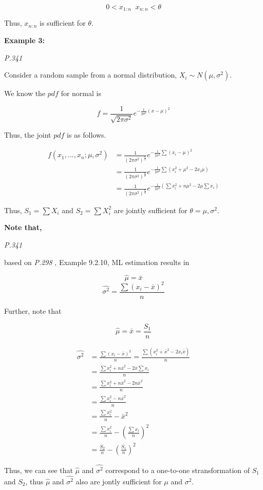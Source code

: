 \documentclass[]{book}
\begin{document}
\[0< x_{1:n}  \; \; x_{n:n} <\theta\]

Thus, \(x_{n:n}\) is sufficient for \(\theta\).

\textbf{Example 3:}

\emph{P.341}

Consider a random sample from a normal distribution, \(X_i \sim N(\mu, \sigma^2)\).

We know the \(pdf\) for normal is

\[f=\frac{1}{\sqrt{2\pi \sigma^2 }} e^{-\frac{1}{2\sigma^2}(x-\mu)^2}\]

Thus, the joint \(pdf\) is as follows.

\[\begin{aligned} f(x_1,...,x_n;\mu,\sigma^2) &=\frac{1}{(2\pi\sigma^2)^{\frac{n}{2}}}e^{-\frac{1}{2\sigma^2}\sum (x_i-\mu)^2} \\ &=\frac{1}{(2\pi\sigma^2)^{\frac{n}{2}}}e^{-\frac{1}{2\sigma^2}\sum (x_i^2+\mu^2-2x_i\mu)} \\ &=\frac{1}{(2\pi\sigma^2)^{\frac{n}{2}}}e^{-\frac{1}{2\sigma^2}(\sum x_i^2+n\mu^2-2\mu\sum x_i)} \end{aligned}\]

Thus, \(S_1=\sum X_i\) and \(S_2=\sum X_i^2\) are jointly sufficient for \(\theta={\mu, \sigma^2}\).

\textbf{Note that,}

\emph{P.341}

based on \emph{P.298} , Example 9.2.10, ML estimation results in

\[\hat{\mu}=\bar{x}\]
\[\hat{\sigma^2}=\frac{\sum(x_i-\bar{x})^2}{n}\]

Further, note that

\[\hat{\mu}=\bar{x}=\frac{S_1}{n}\]

\[\begin{aligned} \hat{\sigma^2}&=\frac{\sum(x_i-\bar{x})^2}{n}=\frac{\sum (x_i^2+\bar{x}^2-2x_i\bar{x})}{n} \\ &=\frac{\sum x_i^2+n\bar{x}^2-2\bar{x} \sum x_i}{n} \\ &=\frac{\sum x_i^2+n\bar{x}^2-2n\bar{x}^2}{n} \\&=\frac{\sum x_i^2-n\bar{x}^2}{n} \\&=\frac{\sum x_i^2}{n}-\bar{x}^2 \\ &=\frac{\sum x_i^2}{n}- (\frac{\sum x_i}{n})^2 \\ &=\frac{S_2}{n}-(\frac{S_1}{n})^2 \end{aligned}\]

Thus, we can see that \(\hat{\mu}\) and \(\hat{\sigma^2}\) correspond to a one-to-one stransformation of \(S_1\) and \(S_2\), thus \(\hat{\mu}\) and \(\hat{\sigma^2}\) also are jontly sufficient for \(\mu\) and \(\sigma^2\).
\end{document}
